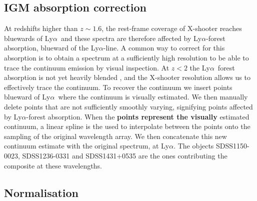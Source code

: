 \documentclass{aa}    %
\newcommand{\sectlabel}[1]{\label{sect:#1}}
\newcommand{\lya}{Ly$\alpha$}
\begin{document}
\subsection{IGM absorption correction} \sectlabel{igm}
At redshifts higher than $z\sim1.6$, the rest-frame coverage of X-shooter
reaches bluewards of \lya~and these spectra are therefore affected by
\lya-forest absorption, blueward of the \lya-line. A common way to correct for
this absorption is to obtain a spectrum at a sufficiently high resolution to be
able to trace the continuum emission by visual inspection. At $z < 2 $ the
\lya~forest absorption is not yet heavily blended \citep{DallAglio2008}, and the
X-shooter resolution allows us to effectively trace the continuum. To recover
the continuum we insert points blueward of \lya~where the continuum is visually estimated.
We then manually delete points that are not sufficiently smoothly
varying, signifying points affected by \lya-forest absorption. 
When the \textbf{points represent the visually} estimated continuum, a linear spline is the used to
interpolate between the points onto the sampling of the original wavelength
array. We then concatenate this new continuum estimate with the original
spectrum, at \lya. The objects SDSS1150-0023, SDSS1236-0331 and SDSS1431+0535
are the ones contributing the composite at these wavelengths. 


\subsection{Normalisation}  \sectlabel{norm}
\end{document}
